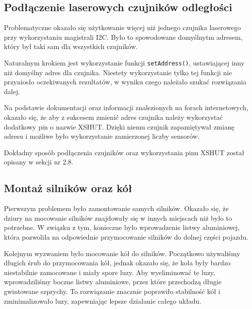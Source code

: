 \documentclass{report}
\begin{document}
\subsection{\Large Podłączenie laserowych czujników odległości}
%
%

Problematyczne okazało się użytkowanie więcej niż jednego czujnika laserowego przy wykorzystaniu magistrali I2C. Było to spowodowane domyślnytm adresem, który był taki sam dla wszystkich czujników. 

Naturalnym krokiem jest wykorzystanie funkcji \texttt{setAddress()}, ustawiającej inny niż domyślny adres dla czujnika. Niestety wykorzystanie tylko tej funkcji nie przyniosło oczekiwanych rezultatów, w wyniku czego należało szukać rozwiązania dalej. 

Na podstawie dokumentacji oraz informacji znalezionych na forach internetowych, okazało się, że aby z sukcesem zmienić adres czujnika należy wykorzystać dodatkowy pin o nazwie XSHUT. Dzięki niemu czujnik zapamiętywał zmianę adresu i możliwe było wykorzystanie zamierzonej liczby sensorów. 

Dokładny sposób podłączenia czujników oraz wykorzystania pinu XSHUT został opisany w sekcji nr 2.8.

\subsection{\Large Montaż silników oraz kół}
%
%
Pierwszym problemem było zamontowanie samych silników. Okazało się, że dziury na mocowanie silników znajdowały się w innych miejscach niż było to potrzebne. W związku z tym, konieczne było wprowadzenie listwy aluminiowej, która pozwoliła na odpowiednie przymocowanie silników do dolnej części pojazdu.

Kolejnym wyzwaniem było mocowanie kół do silników. Początkowo używaliśmy długich śrub do przymocowania kół, jednak okazało się, że koła były bardzo niestabilnie zamocowane i miały spore luzy. Aby wyeliminować te luzy, wprowadziliśmy boczne listwy aluminiowe, przez które przechodzą długie gwintowane szprychy. To rozwiązanie znacznie poprawiło stabilność kół i zminimalizowało luzy, zapewniając lepsze działanie całego układu.
\end{document}
